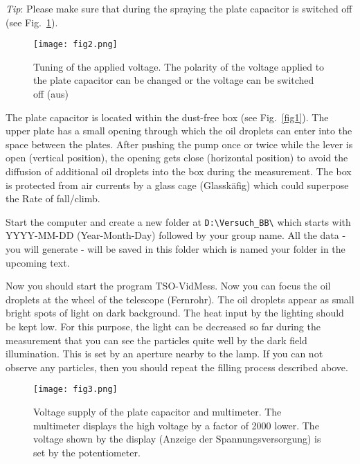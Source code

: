 \documentclass{tudphygp_eng}
\begin{document}
\emph{Tip}: Please make sure that during the spraying the plate capacitor is switched off (see Fig.~\ref{fig2}).

\begin{figure}[t]
\begin{center}
\texttt{[image: fig2.png]} 
\caption{Tuning of the applied voltage. The polarity of the voltage applied to the plate capacitor can be changed or the voltage can be switched off (\grqq{}aus\grqq{})}
\label{fig2}
\end{center}
\end{figure}

The plate capacitor is located within the dust-free box (see Fig.~\ref{fig1}). The upper plate has a small opening through which the oil droplets can enter into the space between the plates. After pushing the pump once or twice while the lever is open (vertical position), the opening gets close (horizontal position) to avoid the diffusion of additional oil droplets into the box during the measurement. The box is protected from air currents by a glass cage (\grqq{}Glassk{\"a}fig\grqq{}) which could superpose the Rate of fall/climb.

Start the computer and create a new folder at \verb|D:\Versuch_BB\| which starts with YYYY-MM-DD (Year-Month-Day) followed by your group name. All the data - you will generate - will be saved in this folder which is named \grqq{}your folder\grqq{} in the upcoming text.

Now you should start the program TSO-VidMess. Now you can focus the oil droplets at the wheel of the telescope (\grqq{}Fernrohr\grqq{}). The oil droplets appear as small bright spots of light on dark background. The heat input by the lighting should be kept low. For this purpose, the light can be decreased so far during the measurement that you can see the particles quite well by the dark field illumination. This is set by an aperture nearby to the lamp. If you can not observe any particles, then you should repeat the filling process described above.

\begin{figure}[t]
\begin{center}
\texttt{[image: fig3.png]} 
\caption{Voltage supply of the plate capacitor and multimeter. The multimeter displays the high voltage by a factor of 2000 lower. The voltage shown by the display (\grqq{}Anzeige der Spannungsversorgung\grqq{}) is set by the potentiometer.}
\label{fig3}
\end{center}
\end{figure}
\end{document}
